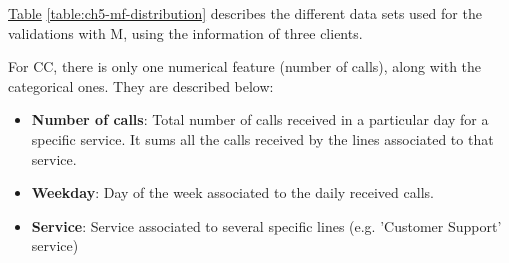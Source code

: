 \hyperref[table:ch5-mf-distribution]{Table} \ref{table:ch5-mf-distribution} describes the different data sets used for the validations with M, using the information of three clients. 

\begin{table}[h!]
\centering
{}
\caption{Data distribution for M, which includes the data set size, the period range considered, and the different organizational levels. C2 organizational information was not available; thus, there is a generic organization that encloses all the lines.}
\label{table:ch5-mf-distribution}
\end{table}

For CC, there is only one numerical feature (number of calls), along with the categorical ones. They are described below:
\begin{itemize}
    \item \textbf{Number of calls}: Total number of calls received in a particular day for a specific service. It sums all the calls received by the lines associated to that service.
    \item \textbf{Weekday}: Day of the week associated to the daily received calls.
    \item \textbf{Service}: Service associated to several specific lines (e.g. 'Customer Support' service)
\end{itemize}

